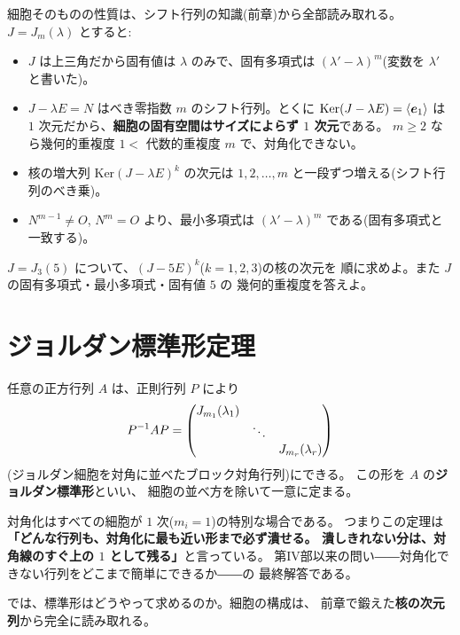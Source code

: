 細胞そのものの性質は、シフト行列の知識(前章)から全部読み取れる。
$J = J_m(\lambda)$ とすると:
\begin{itemize}
\item $J$ は上三角だから固有値は $\lambda$ のみで、固有多項式は
$(\lambda' - \lambda)^m$(変数を $\lambda'$ と書いた)。
\item $J - \lambda E = N$ はべき零指数 $m$ のシフト行列。とくに
$\mathrm{Ker}(J - \lambda E) = \langle \bm{e}_1 \rangle$ は
$1$ 次元だから、\textbf{細胞の固有空間はサイズによらず $1$ 次元}である。
$m \ge 2$ なら幾何的重複度 $1 <$ 代数的重複度 $m$ で、対角化できない。
\item 核の増大列 $\mathrm{Ker}(J - \lambda E)^k$ の次元は
$1, 2, \dots, m$ と一段ずつ増える(シフト行列のべき乗)。
\item $N^{m-1} \neq O$, $N^m = O$ より、最小多項式は
$(\lambda' - \lambda)^m$ である(固有多項式と一致する)。
\end{itemize}

\begin{mondai}\label{q:jordan-cell}
$J = J_3(5)$ について、$(J - 5E)^k$($k = 1, 2, 3$)の核の次元を
順に求めよ。また $J$ の固有多項式・最小多項式・固有値 $5$ の
幾何的重複度を答えよ。
\end{mondai}

\section{ジョルダン標準形定理}

\begin{teiri}[ジョルダン標準形]\label{thm:jordan-main}
任意の正方行列 $A$ は、正則行列 $P$ により
\[
P^{-1} A P = \begin{pmatrix}J_{m_1}(\lambda_1) & & \\ & \ddots & \\ & & J_{m_r}(\lambda_r)\end{pmatrix}
\]
(ジョルダン細胞を対角に並べたブロック対角行列)にできる。
この形を $A$ の\textbf{ジョルダン標準形}といい、
細胞の並べ方を除いて一意に定まる。
\end{teiri}

対角化はすべての細胞が $1$ 次($m_i = 1$)の特別な場合である。
つまりこの定理は\textbf{「どんな行列も、対角化に最も近い形まで必ず潰せる。
潰しきれない分は、対角線のすぐ上の $1$ として残る」}と言っている。
第IV部以来の問い――対角化できない行列をどこまで簡単にできるか――の
最終解答である。

では、標準形はどうやって求めるのか。細胞の構成は、
前章で鍛えた\textbf{核の次元列}から完全に読み取れる。

